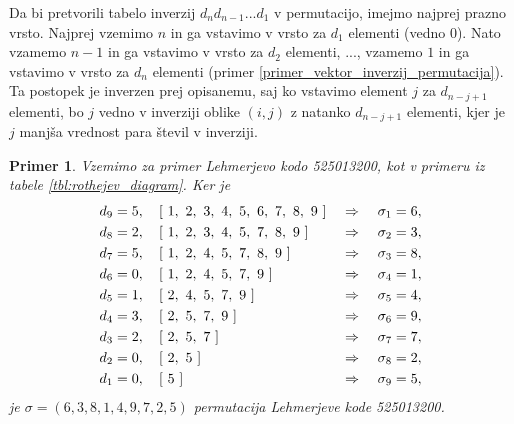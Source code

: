 \documentclass[a4paper, 12pt]{book}
\newtheorem{primer}{Primer}[chapter]
\begin{document}
Da bi pretvorili tabelo inverzij $d_nd_{n-1}...d_1$ v permutacijo, imejmo najprej prazno vrsto. Najprej vzemimo $n$ in ga vstavimo v vrsto za $d_1$ elementi (vedno $0$). Nato vzamemo $n-1$ in ga vstavimo v vrsto za $d_{2}$ elementi, ..., vzamemo $1$ in ga vstavimo v vrsto za $d_{n}$ elementi (primer \ref{primer_vektor_inverzij_permutacija}). Ta postopek je inverzen prej opisanemu, saj ko vstavimo element $j$ za $d_{n-j+1}$ elementi, bo $j$ vedno v inverziji oblike $(i, j)$ z natanko $d_{n-j+1}$ elementi, kjer je $j$ manjša vrednost para števil v inverziji.

\begin{primer}
\label{primer_lehmerjeva_koda_permutacija}
Vzemimo za primer Lehmerjevo kodo 525013200, kot v primeru iz tabele \ref{tbl:rothejev_diagram}. Ker je
\begin{align}
    &d_9 = 5, \quad [ \ 1, \ 2, \ 3, \ 4, \ 5, \ 6, \ 7, \ 8, \ 9 \ ]  \ &\Rightarrow& \ &\sigma_1 = 6, \notag \\
    &d_8 = 2, \quad [ \ 1, \ 2, \ 3, \ 4, \ 5, \ 7, \ 8, \ 9 \ ] \ &\Rightarrow& \ &\sigma_2 = 3, \notag \\
    &d_7 = 5, \quad [ \ 1, \ 2, \ 4, \ 5, \ 7, \ 8, \ 9 \ ] \ &\Rightarrow& \ &\sigma_3 = 8, \notag \\
    &d_6 = 0, \quad [ \ 1, \ 2, \ 4, \ 5, \ 7, \ 9 \ ] \ &\Rightarrow& \ &\sigma_4 = 1, \notag \\
    &d_5 = 1, \quad [ \ 2, \ 4, \ 5, \ 7, \ 9 \ ] \ &\Rightarrow& \ &\sigma_5 = 4, \notag \\
    &d_4 = 3, \quad [ \ 2, \ 5, \ 7, \ 9 \ ] \ &\Rightarrow& \ &\sigma_6 = 9, \notag \\
    &d_3 = 2, \quad [ \ 2, \ 5, \ 7 \ ] \ &\Rightarrow& \ &\sigma_7 = 7, \notag \\
    &d_2 = 0, \quad [ \ 2, \ 5 \ ] \ &\Rightarrow& \ &\sigma_8 = 2, \notag \\
    &d_1 = 0, \quad [ \ 5 \ ] \ &\Rightarrow& \ &\sigma_9 = 5, \notag
\end{align}
je $\sigma = (6, 3, 8, 1, 4, 9, 7, 2, 5)$ permutacija Lehmerjeve kode 525013200.
\end{primer}
\end{document}
